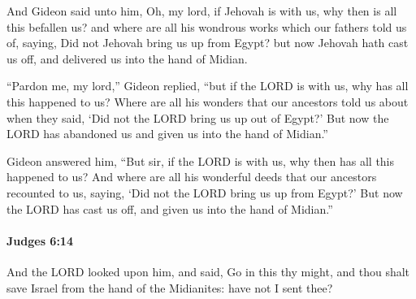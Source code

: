 			\begin{versebox}
					\item[BHS] 
					\item[ASV] And Gideon said unto him, Oh, my lord, if Jehovah is with us, why then is all this befallen us? and where are all his wondrous works which our fathers told us of, saying, Did not Jehovah bring us up from Egypt? but now Jehovah hath cast us off, and delivered us into the hand of Midian.
					\item[NIV] “Pardon me, my lord,” Gideon replied, “but if the LORD is with us, why has all this happened to us? Where are all his wonders that our ancestors told us about when they said, ‘Did not the LORD bring us up out of Egypt?’ But now the LORD has abandoned us and given us into the hand of Midian.”
					\item[NRSV] Gideon answered him, “But sir, if the LORD is with us, why then has all this happened to us? And where are all his wonderful deeds that our ancestors recounted to us, saying, ‘Did not the LORD bring us up from Egypt?’ But now the LORD has cast us off, and given us into the hand of Midian.”
			\end{versebox}

		\paragraph{Judges 6:14} %
			\label{JUDGES-6-14}

			And the LORD looked upon him, and said, Go in this thy might, and thou shalt save Israel from the hand of the Midianites: have not I sent thee?

